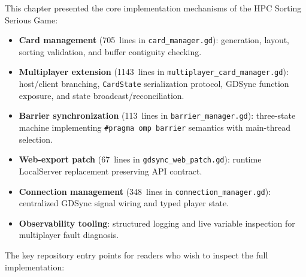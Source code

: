 This chapter presented the core implementation mechanisms of the HPC Sorting Serious Game:
\begin{itemize}
    \item \textbf{Card management} (705~lines in \texttt{card\_manager.gd}): generation, layout, sorting validation, and buffer contiguity checking.
    \item \textbf{Multiplayer extension} (1143~lines in \texttt{multiplayer\_card\_manager.gd}): host/client branching, \texttt{CardState} serialization protocol, GDSync function exposure, and state broadcast/reconciliation.
    \item \textbf{Barrier synchronization} (113~lines in \texttt{barrier\_manager.gd}): three-state machine implementing \texttt{\#pragma omp barrier} semantics with main-thread selection.
    \item \textbf{Web-export patch} (67~lines in \texttt{gdsync\_web\_patch.gd}): runtime LocalServer replacement preserving API contract.
    \item \textbf{Connection management} (348~lines in \texttt{connection\_manager.gd}): centralized GDSync signal wiring and typed player state.
    \item \textbf{Observability tooling}: structured logging and live variable inspection for multiplayer fault diagnosis.
\end{itemize}

\noindent The key repository entry points for readers who wish to inspect the full implementation:

